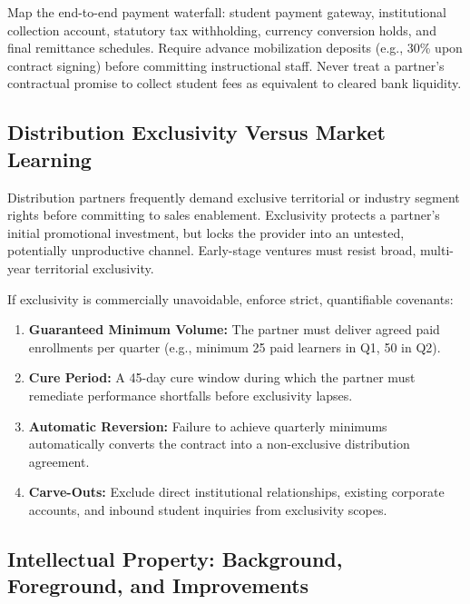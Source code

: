Map the end-to-end payment waterfall: student payment gateway, institutional collection account, statutory tax withholding, currency conversion holds, and final remittance schedules. Require advance mobilization deposits (e.g., 30\% upon contract signing) before committing instructional staff. Never treat a partner's contractual promise to collect student fees as equivalent to cleared bank liquidity.

\subsection{Distribution Exclusivity Versus Market Learning}
\label{sec:exclusivity_versus_market_learning}

Distribution partners frequently demand exclusive territorial or industry segment rights before committing to sales enablement. Exclusivity protects a partner's initial promotional investment, but locks the provider into an untested, potentially unproductive channel. Early-stage ventures must resist broad, multi-year territorial exclusivity.

If exclusivity is commercially unavoidable, enforce strict, quantifiable covenants:
\begin{enumerate}
\item \textbf{Guaranteed Minimum Volume:} The partner must deliver agreed paid enrollments per quarter (e.g., minimum 25 paid learners in Q1, 50 in Q2).
\item \textbf{Cure Period:} A 45-day cure window during which the partner must remediate performance shortfalls before exclusivity lapses.
\item \textbf{Automatic Reversion:} Failure to achieve quarterly minimums automatically converts the contract into a non-exclusive distribution agreement.
\item \textbf{Carve-Outs:} Exclude direct institutional relationships, existing corporate accounts, and inbound student inquiries from exclusivity scopes.
\end{enumerate}

\subsection{Intellectual Property: Background, Foreground, and Improvements}
\label{sec:intellectual_property_governance}


